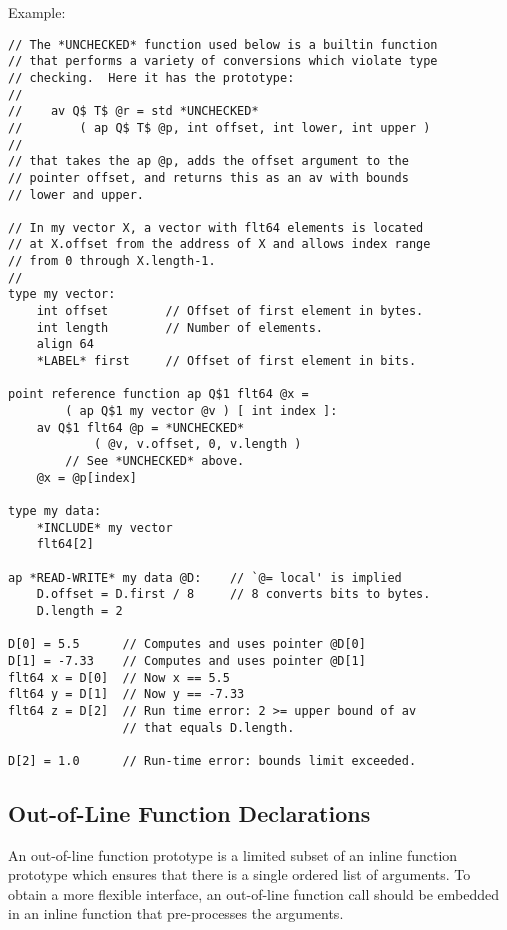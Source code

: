 \documentclass[12pt]{article}
\newenvironment{indpar}[1][0.3in]%
	{\begin{list}{}%
		     {\setlength{\itemsep}{0in}%
		      \setlength{\topsep}{0in}%
		      \setlength{\parsep}{1ex}%
		      \setlength{\labelwidth}{#1}%
		      \setlength{\leftmargin}{#1}%
		      \addtolength{\leftmargin}{\labelsep}}%
	 \item}%
	{\end{list}}
\begin{document}
Example:

\begin{indpar}\label{REFERENCE-FUNCTION-EXAMPLE}\begin{verbatim}
// The *UNCHECKED* function used below is a builtin function
// that performs a variety of conversions which violate type
// checking.  Here it has the prototype:
//
//    av Q$ T$ @r = std *UNCHECKED*
//        ( ap Q$ T$ @p, int offset, int lower, int upper )
//
// that takes the ap @p, adds the offset argument to the
// pointer offset, and returns this as an av with bounds
// lower and upper.

// In my vector X, a vector with flt64 elements is located
// at X.offset from the address of X and allows index range
// from 0 through X.length-1.
//
type my vector:
    int offset        // Offset of first element in bytes.
    int length        // Number of elements.
    align 64
    *LABEL* first     // Offset of first element in bits.

point reference function ap Q$1 flt64 @x =
        ( ap Q$1 my vector @v ) [ int index ]:
    av Q$1 flt64 @p = *UNCHECKED*
            ( @v, v.offset, 0, v.length )
        // See *UNCHECKED* above.
    @x = @p[index]

type my data:
    *INCLUDE* my vector
    flt64[2]

ap *READ-WRITE* my data @D:    // `@= local' is implied
    D.offset = D.first / 8     // 8 converts bits to bytes.
    D.length = 2

D[0] = 5.5      // Computes and uses pointer @D[0]
D[1] = -7.33    // Computes and uses pointer @D[1]
flt64 x = D[0]  // Now x == 5.5
flt64 y = D[1]  // Now y == -7.33
flt64 z = D[2]  // Run time error: 2 >= upper bound of av
                // that equals D.length.

D[2] = 1.0      // Run-time error: bounds limit exceeded.
\end{verbatim}\end{indpar}


\subsection{Out-of-Line Function Declarations}
\label{OUT-OF-LINE-FUNCTION-DECLARATIONS}

An out-of-line function prototype is a limited subset of
an inline function prototype which ensures that there is
a single ordered list of arguments.  To obtain a more
flexible interface, an out-of-line function call should
be embedded in an inline function that pre-processes the
arguments.
\end{document}
